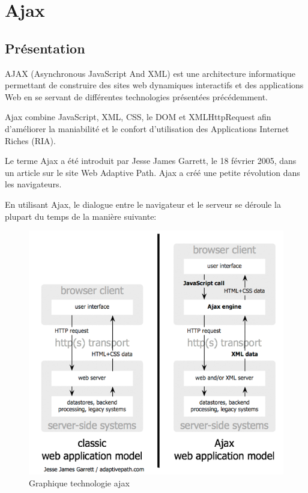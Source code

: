 \section{Ajax}
\label{ch:ajax}

\subsection{Présentation}

AJAX (Asynchronous JavaScript And XML) est une architecture informatique permettant de construire des sites web dynamiques interactifs et des applications Web en se servant de différentes technologies présentées précédemment.

Ajax combine JavaScript, XML, CSS, le DOM et XMLHttpRequest afin d’améliorer la maniabilité et le confort d’utilisation des Applications Internet Riches (RIA).

Le terme Ajax a été introduit par Jesse James Garrett, le 18 février 2005, dans un article sur le site Web Adaptive Path. Ajax a créé une petite révolution dans les navigateurs.

En utilisant Ajax, le dialogue entre le navigateur et le serveur se déroule la plupart du temps de la manière suivante:

\begin{figure}[ht!]
\begin{center}
\includegraphics[scale=0.6]{img/ajax.png}
\caption{Graphique technologie ajax}
\end{center}
\end{figure}


